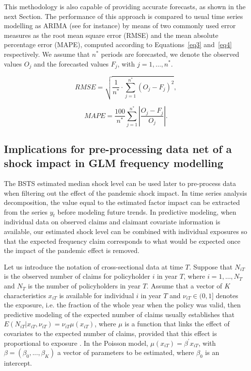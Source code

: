 \documentclass[]{risa}
\begin{document}

This methodology is also capable of providing accurate forecasts, as shown in the next Section. The performance of this approach is compared to usual time series modelling as ARIMA (see for instance\cite{shumway_arima_2017}) by means of two commonly used error measures as the root mean square error (RMSE) and the mean absolute percentage error (MAPE), computed according to Equations~\ref{eq3} and~\ref{eq4} respectively. We assume that $n^*$ periods are forecasted, we denote the observed values $O_j$ and the forecasted values $F_j$, with $j=1,\dots, n^*$.

\begin{equation}\label{eq3}
RMSE=\sqrt{\frac{1}{n^*} \cdot \sum_{j=1}^{n^*} (O_j-F_j)^2},
\end{equation}

\begin{equation}\label{eq4}
MAPE=\frac{100}{n^*} \sum_{j=1}^{n^*} \left | \frac{O_j-F_j}{O_j} \right |.
\end{equation}

\subsection{Implications for pre-processing data net of a shock impact in GLM frequency modelling}

The BSTS estimated median shock level can be used later to pre-process data when filtering out the effect of the pandemic shock impact. In time series analysis decomposition, the value equal to the estimated factor impact can be extracted from the series $y_t$ before modeling future trends. In predictive modeling, when individual data on observed claims and claimant covariate information is available, our estimated shock level can be combined with individual exposures so that the expected frequency claim corresponds to what would be expected once the impact of the pandemic effect is removed.

Let us introduce the notation of cross-sectional data at time $T$. Suppose that $N_{iT}$ is the observed number of claims for policyholder $i$ in year $T$, where $i=1,\dots, N_T$ and $N_T$ is the number of policyholders in year $T$. Assume that a vector of $K$ characteristics $x_{iT}$ is available for individual $i$ in year $T$ and $\nu_{iT} \in (0,1]$ denotes the exposure, i.e. the fraction of the whole year when the policy was valid, then predictive modeling of the expected number of claims usually establishes that $E(N_{iT}|x_{iT}, \nu_{iT})= \nu_{iT}\mu(x_{iT})$, where $\mu$ is a function that links the effect of covariates to the expected number of claims, provided that this effect is proportional to exposure \cite{wuthrich2023statistical}. In the Poisson model, $\mu(x_{iT})=\beta^\prime x_{iT}$, with $\beta = (\beta_0,...,\beta_K)$ a vector of parameters to be estimated, where $\beta_0$ is an intercept.
\end{document}
